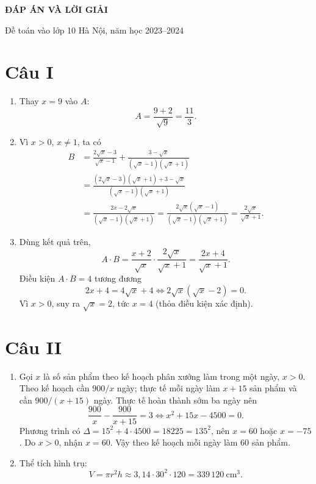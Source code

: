 \documentclass[12pt,a4paper]{article}
\begin{document}
\begin{center}{\Large\bfseries ĐÁP ÁN VÀ LỜI GIẢI}\par Đề toán vào lớp 10 Hà Nội, năm học 2023--2024\par{}\end{center}

\section*{Câu I}
\begin{enumerate}
\item Thay $x=9$ vào $A$:
\[
A=\frac{9+2}{\sqrt9}=\frac{11}{3}.
\]
\item Vì $x>0$, $x\ne1$, ta có
\begin{align*}
B&=\frac{2\sqrt{x}-3}{\sqrt{x}-1}+\frac{3-\sqrt{x}}{(\sqrt{x}-1)(\sqrt{x}+1)}\\
&=\frac{(2\sqrt{x}-3)(\sqrt{x}+1)+3-\sqrt{x}}{(\sqrt{x}-1)(\sqrt{x}+1)}\\
&=\frac{2x-2\sqrt{x}}{(\sqrt{x}-1)(\sqrt{x}+1)}
=\frac{2\sqrt{x}(\sqrt{x}-1)}{(\sqrt{x}-1)(\sqrt{x}+1)}
=\frac{2\sqrt{x}}{\sqrt{x}+1}.
\end{align*}
\item Dùng kết quả trên,
\[
A\cdot B=\frac{x+2}{\sqrt{x}}\cdot\frac{2\sqrt{x}}{\sqrt{x}+1}=\frac{2x+4}{\sqrt{x}+1}.
\]
Điều kiện $A\cdot B=4$ tương đương
\[
2x+4=4\sqrt{x}+4\iff 2\sqrt{x}(\sqrt{x}-2)=0.
\]
Vì $x>0$, suy ra $\sqrt{x}=2$, tức $x=4$ (thỏa điều kiện xác định).
\end{enumerate}

\section*{Câu II}
\begin{enumerate}
\item Gọi $x$ là số sản phẩm theo kế hoạch phân xưởng làm trong một ngày, $x>0$. Theo kế hoạch cần $900/x$ ngày; thực tế mỗi ngày làm $x+15$ sản phẩm và cần $900/(x+15)$ ngày. Thực tế hoàn thành sớm ba ngày nên
\[
\frac{900}{x}-\frac{900}{x+15}=3
\iff x^2+15x-4500=0.
\]
Phương trình có $\Delta=15^2+4\cdot4500=18225=135^2$, nên $x=60$ hoặc $x=-75$. Do $x>0$, nhận $x=60$. Vậy theo kế hoạch mỗi ngày làm 60 sản phẩm.
\item Thể tích hình trụ:
\[
V=\pi r^2h\approx3{,}14\cdot30^2\cdot120=339\,120\ \mathrm{cm}^3.
\]
\end{enumerate}
\end{document}

